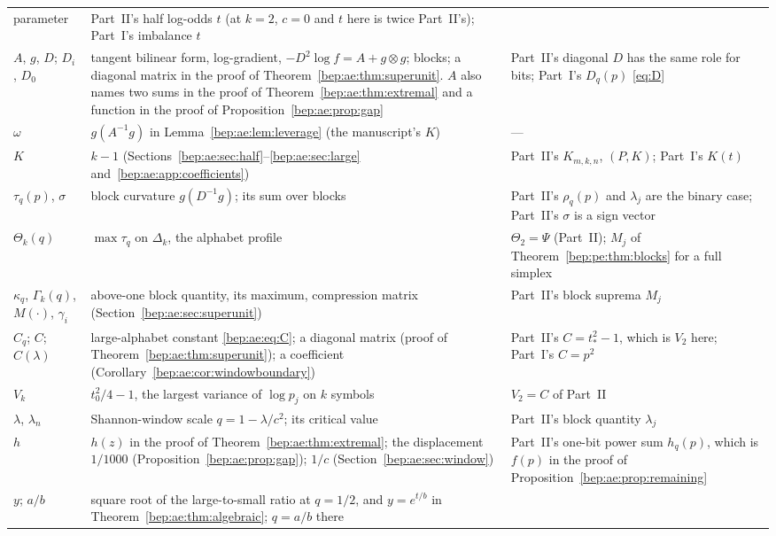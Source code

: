 \documentclass[11pt]{article}
\numberwithin{equation}{section}
\theoremstyle{definition}
\theoremstyle{remark}
\begin{document}
\begin{longtable}{@{}>{\raggedright\arraybackslash}p{}
 >{\raggedright\arraybackslash}p{}
 >{\raggedright\arraybackslash}p{}@{}}
 parameter & Part~II's half log-odds $t$ (at $k=2$, $c=0$ and $t$ here is
 twice Part~II's); Part~I's imbalance $t$\\
$A$, $g$, $D$; $D_i$, $D_0$ & tangent bilinear form, log-gradient,
 $-D^2\log f=A+g\otimes g$; blocks; a diagonal matrix in the proof of
 Theorem~\ref{bep:ae:thm:superunit}. $A$ also names two sums in the
 proof of Theorem~\ref{bep:ae:thm:extremal} and a function in the proof
 of Proposition~\ref{bep:ae:prop:gap} & Part~II's diagonal $D$ has the
 same role for bits; Part~I's $D_q(p)$ \eqref{eq:D}\\
$\omega$ & $g(A^{-1}g)$ in Lemma~\ref{bep:ae:lem:leverage} (the
 manuscript's $K$) & ---\\
$K$ & $k-1$ (Sections~\ref{bep:ae:sec:half}--\ref{bep:ae:sec:large}
 and~\ref{bep:ae:app:coefficients}) & Part~II's $K_{m,k,n}$, $(P,K)$;
 Part~I's $K(t)$\\
$\tau_q(p)$, $\sigma$ & block curvature $g(D^{-1}g)$; its sum over
 blocks & Part~II's $\rho_q(p)$ and $\lambda_j$ are the binary
 case; Part~II's $\sigma$ is a sign vector\\
$\Theta_k(q)$ & $\max\tau_q$ on $\Delta_k$, the alphabet profile &
 $\Theta_2=\Psi$ (Part~II); $M_j$ of Theorem~\ref{bep:pe:thm:blocks} for
 a full simplex\\
$\kappa_q$, $\Gamma_k(q)$, $M(\cdot)$, $\gamma_i$ & above-one block
 quantity, its maximum, compression matrix
 (Section~\ref{bep:ae:sec:superunit}) & Part~II's block suprema $M_j$\\
$C_q$; $C$; $C(\lambda)$ & large-alphabet constant \eqref{bep:ae:eq:C};
 a diagonal matrix (proof of Theorem~\ref{bep:ae:thm:superunit}); a
 coefficient (Corollary~\ref{bep:ae:cor:windowboundary}) & Part~II's
 $C=t_*^2-1$, which is $V_2$ here; Part~I's $C=p^2$\\
$V_k$ & $t_0^2/4-1$, the largest variance of $\log p_j$ on $k$ symbols
 & $V_2=C$ of Part~II\\
$\lambda$, $\lambda_n$ & Shannon-window scale $q=1-\lambda/c^2$;
 its critical value & Part~II's block quantity $\lambda_j$\\
$h$ & $h(z)$ in the proof of Theorem~\ref{bep:ae:thm:extremal};
 the displacement $1/1000$ (Proposition~\ref{bep:ae:prop:gap});
 $1/c$ (Section~\ref{bep:ae:sec:window}) & Part~II's one-bit power sum
 $h_q(p)$, which is $f(p)$ in the proof of
 Proposition~\ref{bep:ae:prop:remaining}\\
$y$; $a/b$ & square root of the large-to-small ratio at $q=1/2$, and
 $y=e^{t/b}$ in Theorem~\ref{bep:ae:thm:algebraic}; $q=a/b$ there &

\end{longtable}
\end{document}
